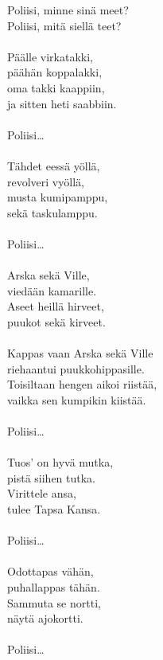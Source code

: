 
        Poliisi, minne sinä meet? \\
        Poliisi, mitä siellä teet? \\
\hspace{10mm} \\
        Päälle virkatakki, \\
        päähän koppalakki, \\
        oma takki kaappiin, \\
        ja sitten heti saabbiin. \\
\hspace{10mm} \\
        Poliisi… \\
\hspace{10mm} \\
        Tähdet eessä yöllä, \\
        revolveri vyöllä, \\
        musta kumipamppu, \\
        sekä taskulamppu. \\
\hspace{10mm} \\
        Poliisi… \\
\hspace{10mm} \\
        Arska sekä Ville, \\
        viedään kamarille. \\
        Aseet heillä hirveet, \\
        puukot sekä kirveet. \\
\hspace{10mm} \\
        Kappas vaan Arska sekä Ville \\
        riehaantui puukkohippasille. \\
        Toisiltaan hengen aikoi riistää, \\
        vaikka sen kumpikin kiistää. \\
\hspace{10mm} \\
        Poliisi… \\
\hspace{10mm} \\
        Tuos' on hyvä mutka, \\
        pistä siihen tutka. \\
        Virittele ansa, \\
        tulee Tapsa Kansa. \\
\hspace{10mm} \\
        Poliisi… \\
\hspace{10mm} \\
        Odottapas vähän, \\
        puhallappas tähän. \\
        Sammuta se nortti, \\
        näytä ajokortti. \\
\hspace{10mm} \\
        Poliisi… \\
